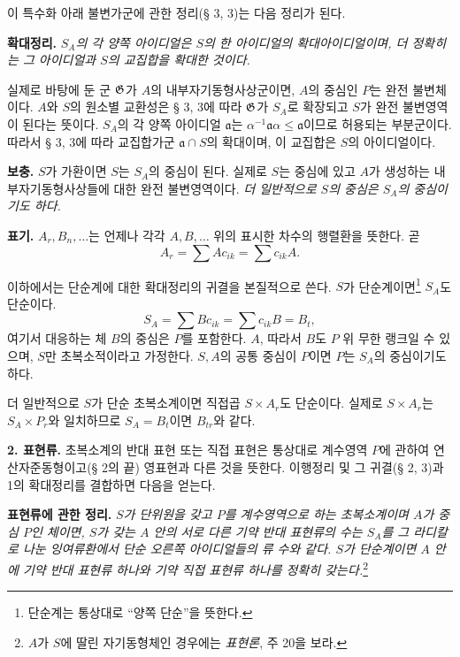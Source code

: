 이 특수화 아래 불변가군에 관한 정리(§ 3, 3)는 다음 정리가 된다.

\noindent\textbf{확대정리.} \emph{\(S_A\)의 각 양쪽 아이디얼은 \(S\)의 한 아이디얼의 확대아이디얼이며, 더 정확히는 그 아이디얼과 \(S\)의 교집합을 확대한 것이다.}

실제로 바탕에 둔 군 \(\mathfrak G\)가 \(A\)의 내부자기동형사상군이면, \(A\)의 중심인 \(P\)는 완전 불변체이다. \(A\)와 \(S\)의 원소별 교환성은 § 3, 3에 따라 \(\mathfrak G\)가 \(S_A\)로 확장되고 \(S\)가 완전 불변영역이 된다는 뜻이다. \(S_A\)의 각 양쪽 아이디얼 \(\mathfrak a\)는 \(\alpha^{-1}\mathfrak a\alpha\le\mathfrak a\)이므로 허용되는 부분군이다. 따라서 § 3, 3에 따라 교집합가군 \(\mathfrak a\cap S\)의 확대이며, 이 교집합은 \(S\)의 아이디얼이다.

\noindent\textbf{보충.} \(S\)가 가환이면 \(S\)는 \(S_A\)의 중심이 된다. 실제로 \(S\)는 중심에 있고 \(A\)가 생성하는 내부자기동형사상들에 대한 완전 불변영역이다. \emph{더 일반적으로 \(S\)의 중심은 \(S_A\)의 중심이기도 하다.}

\noindent\textbf{표기.} \(A_r,B_n,\ldots\)는 언제나 각각 \(A,B,\ldots\) 위의 표시한 차수의 행렬환을 뜻한다. 곧
\[
A_r=\sum A c_{ik}=\sum c_{ik}A.
\]

이하에서는 단순계에 대한 확대정리의 귀결을 본질적으로 쓴다. \(S\)가 단순계이면\footnote{단순계는 통상대로 “양쪽 단순”을 뜻한다.} \(S_A\)도 단순이다.
\[
S_A=\sum Bc_{ik}=\sum c_{ik}B=B_t,
\]
여기서 대응하는 체 \(B\)의 중심은 \(P\)를 포함한다. \(A\), 따라서 \(B\)도 \(P\) 위 무한 랭크일 수 있으며, \(S\)만 초복소적이라고 가정한다. \(S,A\)의 공통 중심이 \(P\)이면 \(P\)는 \(S_A\)의 중심이기도 하다.

더 일반적으로 \(S\)가 단순 초복소계이면 직접곱 \(S\times A_r\)도 단순이다. 실제로 \(S\times A_r\)는 \(S_A\times P_r\)와 일치하므로 \(S_A=B_t\)이면 \(B_{tr}\)와 같다.

\noindent\textbf{2. 표현류.} 초복소계의 반대 표현 또는 직접 표현은 통상대로 계수영역 \(P\)에 관하여 연산자준동형이고(§ 2의 끝) 영표현과 다른 것을 뜻한다. 이행정리 및 그 귀결(§ 2, 3)과 1의 확대정리를 결합하면 다음을 얻는다.

\noindent\textbf{표현류에 관한 정리.} \emph{\(S\)가 단위원을 갖고 \(P\)를 계수영역으로 하는 초복소계이며 \(A\)가 중심 \(P\)인 체이면, \(S\)가 갖는 \(A\) 안의 서로 다른 기약 반대 표현류의 수는 \(S_A\)를 그 라디칼로 나눈 잉여류환에서 단순 오른쪽 아이디얼들의 류 수와 같다. \(S\)가 단순계이면 \(A\) 안에 기약 반대 표현류 하나와 기약 직접 표현류 하나를 정확히 갖는다.}\footnote{\normalfont \(A\)가 \(S\)에 딸린 자기동형체인 경우에는 \emph{표현론}, 주 20을 보라.}


